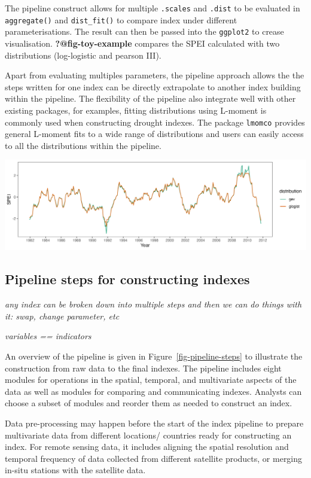 \documentclass[
]{interact}
\begin{document}
The pipeline construct allows for multiple \texttt{.scales} and
\texttt{.dist} to be evaluated in \texttt{aggregate()} and
\texttt{dist\_fit()} to compare index under different parameterisations.
The result can then be passed into the \texttt{ggplot2} to crease
visualisation. \textbf{?@fig-toy-example} compares the SPEI calculated
with two distributions (log-logistic and pearson III).

Apart from evaluating multiples parameters, the pipeline approach allows
the the steps written for one index can be directly extrapolate to
another index building within the pipeline. The flexibility of the
pipeline also integrate well with other existing packages, for examples,
fitting distributions using L-moment is commonly used when constructing
drought indexes. The package \texttt{lmomco} provides general L-moment
fits to a wide range of distributions and users can easily access to all
the distributions within the pipeline.

\includegraphics[width=1\textwidth,height=\textheight]{figures/toy-example-spei.png}

\hypertarget{pipeline-steps-for-constructing-indexes}{%
\subsection{Pipeline steps for constructing
indexes}\label{pipeline-steps-for-constructing-indexes}}

\emph{any index can be broken down into multiple steps and then we can
do things with it: swap, change parameter, etc}

\emph{variables == indicators}

An overview of the pipeline is given in Figure~\ref{fig-pipeline-steps}
to illustrate the construction from raw data to the final indexes. The
pipeline includes eight modules for operations in the spatial, temporal,
and multivariate aspects of the data as well as modules for comparing
and communicating indexes. Analysts can choose a subset of modules and
reorder them as needed to construct an index.

Data pre-processing may happen before the start of the index pipeline to
prepare multivariate data from different locations/ countries ready for
constructing an index. For remote sensing data, it includes aligning the
spatial resolution and temporal frequency of data collected from
different satellite products, or merging in-situ stations with the
satellite data.
\end{document}
